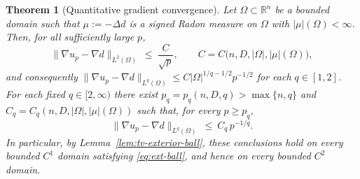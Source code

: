 \documentclass[11pt]{article}
\newcommand{\R}{\mathbb R}
\newcommand{\abs}[1]{\lvert #1\rvert}
\newcommand{\norm}[1]{\lVert #1\rVert}
\newtheorem{theorem}{Theorem}[section]
\theoremstyle{definition}
\theoremstyle{remark}
\begin{document}
\begin{theorem}[Quantitative gradient convergence]\label{thm:gradient-rate}
Let $\Omega\subset\R^n$ be a bounded domain such that $\mu:=-\Delta d$
is a signed Radon measure on $\Omega$ with $\abs{\mu}(\Omega)<\infty$. Then,
for all sufficiently large $p$,
\begin{equation}\label{eq:L2-rate}
\norm{\nabla u_p-\nabla d}_{L^2(\Omega)}\ \le\ \frac{C}{\sqrt p},
\qquad C=C\bigl(n,D,\abs\Omega,\abs\mu(\Omega)\bigr),
\end{equation}
and consequently
$\norm{\nabla u_p-\nabla d}_{L^q(\Omega)}\le C\abs\Omega^{1/q-1/2}p^{-1/2}$ for
each $q\in[1,2]$. For each fixed $q\in[2,\infty)$ there exist
$p_q=p_q(n,D,q)>\max\{n,q\}$ and $C_q=C_q(n,D,\abs\Omega,\abs\mu(\Omega))$
such that, for every $p\ge p_q$,
\begin{equation}\label{eq:Lq-rate}
\norm{\nabla u_p-\nabla d}_{L^q(\Omega)}\ \le\ C_q\,p^{-1/q}.
\end{equation}
In particular, by Lemma~\ref{lem:tv-exterior-ball}, these conclusions hold on
every bounded $C^1$ domain satisfying \eqref{eq:ext-ball}, and hence on every
bounded $C^2$ domain.
\end{theorem}
\end{document}

